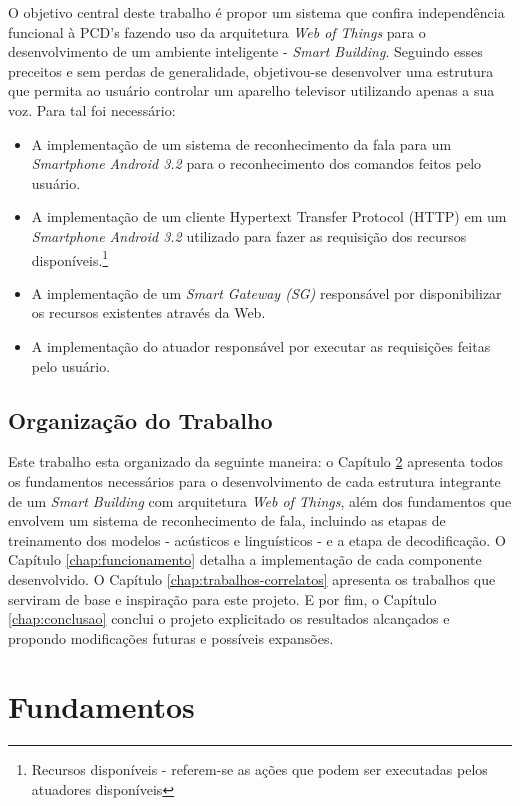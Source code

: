 \documentclass[12pt,a4paper,oneside]{report}
\begin{document}
O objetivo central deste trabalho é propor um sistema que confira independência funcional à PCD's fazendo uso da arquitetura \emph{Web of Things} para o desenvolvimento de um ambiente inteligente - \emph{Smart Building}. Seguindo esses preceitos e sem perdas de generalidade, objetivou-se desenvolver uma estrutura que permita ao usuário controlar um aparelho televisor utilizando apenas a sua voz. Para tal foi necessário:
\begin{itemize}
\item A implementação de um sistema de reconhecimento da fala para um \emph{Smartphone Android 3.2} para o reconhecimento dos comandos feitos pelo usuário.
\item A implementação de um cliente Hypertext Transfer Protocol (HTTP) em um \emph{Smartphone Android 3.2} utilizado para fazer as requisição dos recursos disponíveis.\footnote{Recursos disponíveis - referem-se as ações que podem ser executadas pelos atuadores disponíveis}
\item A implementação de um \emph{Smart Gateway (SG)} responsável por disponibilizar os recursos existentes através da Web.
\item A implementação do atuador responsável por executar as requisições feitas pelo usuário.
\end{itemize}

\section{Organização do Trabalho}

Este trabalho esta organizado da seguinte maneira: o Capítulo \ref{chap:fundamentos} apresenta todos os fundamentos necessários para o desenvolvimento de cada estrutura integrante de um \emph{Smart Building} com arquitetura \emph{Web of Things}, além dos fundamentos que envolvem um sistema de reconhecimento de fala, incluindo as etapas de treinamento dos modelos - acústicos e linguísticos - e a etapa de decodificação. O Capítulo \ref{chap:funcionamento} detalha a implementação de cada componente desenvolvido. O Capítulo \ref{chap:trabalhos-correlatos} apresenta os trabalhos que serviram de base e inspiração para este projeto. E por fim, o Capítulo \ref{chap:conclusao} conclui o projeto explicitado os resultados alcançados e propondo modificações futuras e possíveis expansões.

\chapter{Fundamentos}
\label{chap:fundamentos}
\end{document}
